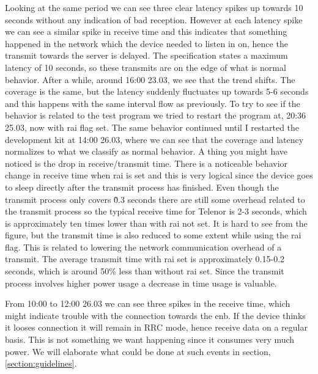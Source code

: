 \documentclass[USenglish]{ifimaster}  %
\begin{document}
Looking at the same period we can see three clear latency spikes up towards 10 seconds without any indication of bad reception. However at each latency spike we can see a similar spike in receive time and this indicates that something happened in the network which the device needed to listen in on, hence the transmit towards the server is delayed. The specification states a maximum latency of 10 seconds, so these transmits are on the edge of what is normal behavior. After a while, around 16:00 23.03, we see that the trend shifts. The coverage is the same, but the latency suddenly fluctuates up towards 5-6 seconds and this happens with the same interval flow as previously. To try to see if the behavior is related to the test program we tried to restart the program at, 20:36 25.03, now with \acrshort{rai} flag set. The same behavior continued until I restarted the development kit at 14:00 26.03, where we can see that the coverage and latency normalizes to what we classify as normal behavior. A thing you might have noticed is the drop in receive/transmit time. There is a noticeable behavior change in receive time when \acrshort{rai} is set and this is very logical since the device goes to sleep directly after the transmit process has finished. Even though the transmit process only covers \~0.3 seconds there are still some overhead related to the transmit process so the typical receive time for Telenor is 2-3 seconds, which is approximately ten times lower than with \acrshort{rai} not set. It is hard to see from the figure, but the transmit time is also reduced to some extent while using the \acrshort{rai} flag. This is related to lowering the network communication overhead of a transmit. The average transmit time with \acrshort{rai} set is approximately 0.15-0.2 seconds, which is around 50\% less than without \acrshort{rai} set. Since the transmit process involves higher power usage a decrease in time usage is valuable.

From 10:00 to 12:00 26.03 we can see three spikes in the receive time, which might indicate trouble with the connection towards the \acrshort{enb}. If the device thinks it looses connection it will remain in RRC mode, hence receive data on a regular basis. This is not something we want happening since it consumes very much power. We will elaborate what could be done at such events in section, \vref{section:guidelines}.
\end{document}
